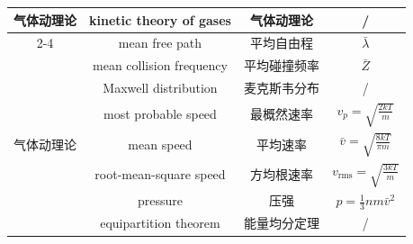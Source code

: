 \documentclass{article}
\begin{document}
\begin{longtable}{|c|c|c|c|}
  \multirow{2}{*}{气体动理论}
  & kinetic theory of gases & 气体动理论 & / \\
  \cline{2-4}
  & mean free path & 平均自由程 & $\bar{\lambda}$ \\
  \hline
  \multirow{7}{*}{气体动理论}
  & mean collision frequency & 平均碰撞频率 & $\bar{Z}$ \\
  \cline{2-4}
  & Maxwell distribution & 麦克斯韦分布 & / \\
  \cline{2-4}
  & most probable speed & 最概然速率 & $v_p=\sqrt{\frac{2kT}{m}}$ \\
  \cline{2-4}
  & mean speed & 平均速率 & $\bar{v}=\sqrt{\frac{8kT}{\pi m}}$ \\
  \cline{2-4}
  & root-mean-square speed & 方均根速率 & $v_{\text{rms}}=\sqrt{\frac{3kT}{m}}$ \\
  \cline{2-4}
  & pressure & 压强 & $p=\frac{1}{3}nm\bar{v}^2$ \\
  \cline{2-4}
  & equipartition theorem & 能量均分定理 & / \\
  \hline
\end{longtable}
\end{document}
